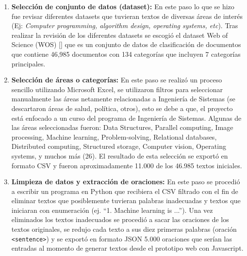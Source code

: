 \documentclass[../Main.tex]{subfiles}
\begin{document}
            \begin{enumerate}
                \item \textbf{Selección de conjunto de datos (dataset):} En este paso lo que se hizo fue revisar diferentes datasets que tuvieran textos de diversas áreas de interés (Ej: \textit{Computer programming, algorithm design, operating systems, etc}). Tras realizar la revisión de los diferentes datasets se escogió el dataset Web of Science (WOS) [] que es un conjunto de datos de clasificación de documentos que contiene 46,985 documentos con 134 categorías que incluyen 7 categorías principales.
                
                \item \textbf{Selección de áreas o categorías:} En este paso se realizó un proceso sencillo utilizando Microsoft Excel, se utilizaron filtros para seleccionar manualmente las áreas netamente relacionadas a Ingeniería de Sistemas (se descartaron áreas de salud, política, otros), esto se debe a que, el proyecto está enfocado a un curso del programa de Ingeniería de Sistemas.
                Algunas de las áreas seleccionadas fueron: Data Structures, Parallel computing, Image processing, Machine learning, Problem-solving, Relational databases, Distributed computing, Structured storage, Computer vision, Operating systems, y muchos más (26). El resultado de esta selección se exportó en formato CSV y fueron aproximadamente 11.000 de los 46.985 textos iniciales.
                
                \item \textbf{Limpieza de datos y extracción de oraciones:} En este paso se procedió a escribir un programa en Python que recibiera el CSV filtrado con el fin de eliminar textos que posiblemente tuvieran palabras inadecuadas y textos que iniciaran con enumeración (ej. ``1. Machine learning is ...'').
                Una vez eliminados los textos inadecuados se procedió a sacar las oraciones de los textos originales, se redujo cada texto a sus diez primeras palabras (oración \texttt{<sentence>}) y se exportó en formato JSON 5.000 oraciones que serían las entradas al momento de generar textos desde el prototipo web con Javascript.
            \end{enumerate}
            
\end{document}
